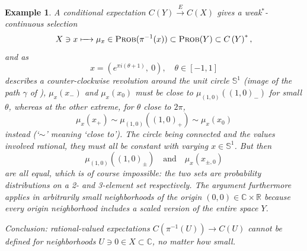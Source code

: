 \documentclass[11pt,leqno]{article}
\theoremstyle{plain}
\theoremstyle{plain}
\theoremstyle{plain}
\newtheorem{example}[lemma]{Example}
\numberwithin{equation}{section}
\theoremstyle{nonumberplain}
\newcommand\bC{{\mathbb C}}
\newcommand\bR{{\mathbb R}}
\newcommand\bS{{\mathbb S}}
\newcommand\1{{\bf 1}}
\newcommand{\cat}[1]{\textsc{#1}}
\begin{document}
\begin{example}
  A conditional expectation $C\left(Y\right)\xrightarrow{E}C\left(X\right)$ gives a weak$^*$-continuous selection
  \begin{equation}\label{eq:prob.val.map}
    X\ni x
    \xmapsto{\quad}
    \mu_x\in\cat{Prob}(\pi^{-1}(x))\subset \cat{Prob}(Y)\subset C\left(Y\right)^*,
  \end{equation}
  and as
  \begin{equation*}
    x
    =
    \left(e^{\pi i (\theta+1)},\ 0\right)
    ,\quad
    \theta\in [-1,1]
  \end{equation*}
  describes a counter-clockwise revolution around the unit circle $\bS^1$ (image of the path $\gamma$ of ), $\mu_x(x_-)$ and $\mu_x(x_0)$ must be close to $\mu_{(1,0)}((1,0)_-)$ for small $\theta$, whereas at the other extreme, for $\theta$ close to $2\pi$,
  \begin{equation*}
    \mu_x(x_+)
    \sim
    \mu_{(1,0)}((1,0)_+)
    \sim
    \mu_x(x_0)
  \end{equation*}
  instead (`$\sim$' meaning `close to'). The circle being connected and the values involved rational, they must all be constant with varying $x\in \bS^1$. But then
  \begin{equation*}
    \mu_{(1,0)}((1,0)_{\pm})
    \quad\text{and}\quad
    \mu_x(x_{\pm,0})
  \end{equation*}
  are all equal, which is of course impossible: the two sets are probability distributions on a 2- and 3-element set respectively. The argument furthermore applies in arbitrarily small neighborhoods of the origin $(0,0)\in \bC\times \bR$ because every origin neighborhood includes a scaled version of the entire space $Y$.

  Conclusion: rational-valued expectations $C(\pi^{-1}(U))\xrightarrow{} C(U)$ cannot be defined for neighborhoods $U\ni 0\in X\subset \bC$, no matter how small. 
\end{example}
\end{document}
